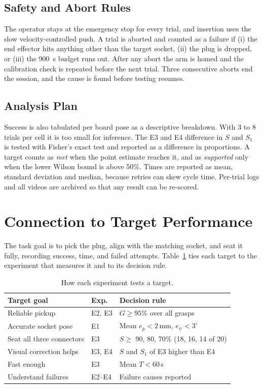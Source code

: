 \documentclass[11pt,conference]{IEEEtran}
\begin{document}
\subsection{Safety and Abort Rules}
The operator stays at the emergency stop for every trial, and insertion uses the slow velocity-controlled push. A trial is aborted and counted as a failure if (i) the end effector hits anything other than the target socket, (ii) the plug is dropped, or (iii) the 900~s budget runs out. After any abort the arm is homed and the calibration check is repeated before the next trial. Three consecutive aborts end the session, and the cause is found before testing resumes.

\subsection{Analysis Plan}
Success is also tabulated per board pose as a descriptive breakdown. With 3 to 8 trials per cell it is too small for inference. The E3 and E4 difference in $S$ and $S_1$ is tested with Fisher's exact test and reported as a difference in proportions. A target counts as \emph{met} when the point estimate reaches it, and as \emph{supported} only when the lower Wilson bound is above 50\%. Times are reported as mean, standard deviation and median, because retries can skew cycle time. Per-trial logs and all videos are archived so that any result can be re-scored.

\section{Connection to Target Performance}

The task goal is to pick the plug, align with the matching socket, and seat it fully, recording success, time, and failed attempts. Table~\ref{tab:link} ties each target to the experiment that measures it and to its decision rule.

\begin{table}[H]
\caption{How each experiment tests a target.}
\label{tab:link}
\centering
\small
\renewcommand{\arraystretch}{1.12}
\begin{tabular}{@{}p{2.2cm}p{1.3cm}p{4.1cm}@{}}
\toprule
\textbf{Target goal} & \textbf{Exp.} & \textbf{Decision rule}\\
\midrule
Reliable pickup & E2, E3 & $G\geq95\%$ over all grasps\\
Accurate socket pose & E1 & Mean $e_p<2$\,mm, $e_\psi<3^\circ$\\
Seat all three connectors & E3 & $S\geq$ 90, 80, 70\% (18, 16, 14 of 20)\\
Visual correction helps & E3, E4 & $S$ and $S_1$ of E3 higher than E4\\
Fast enough & E3 & Mean $T<60$\,s\\
Understand failures & E2--E4 & Failure causes reported\\
\bottomrule
\end{tabular}
\end{table}
\end{document}
